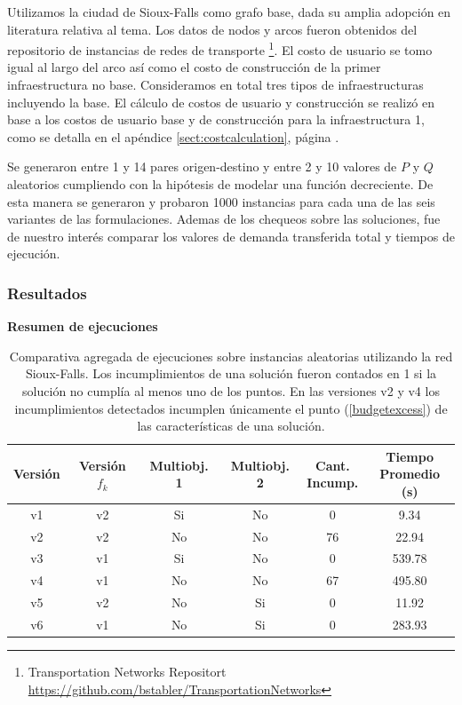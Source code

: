 \documentclass{article}
\begin{document}
  Utilizamos la ciudad de Sioux-Falls como grafo base, dada su amplia adopción en literatura relativa al tema. Los datos de nodos y arcos fueron obtenidos del repositorio de instancias de redes de transporte \footnote{Transportation Networks Repositort \url{https://github.com/bstabler/TransportationNetworks}}. El costo de usuario se tomo igual al largo del arco así como el costo de construcción de la primer infraestructura no base. Consideramos en total tres tipos de infraestructuras incluyendo la base. El cálculo de costos de usuario y construcción se realizó en base a los costos de usuario base y de construcción para la infraestructura 1, como se detalla en el apéndice \ref{sect:costcalculation}, página \pageref{sect:costcalculation}.

  Se generaron entre 1 y 14 pares origen-destino y entre 2 y 10 valores de $P$ y $Q$ aleatorios cumpliendo con la hipótesis de modelar una función decreciente.
  De esta manera se generaron y probaron 1000 instancias para cada una de las seis variantes de las formulaciones. Ademas de los chequeos sobre las soluciones, fue de nuestro interés comparar los valores de demanda transferida total y tiempos de ejecución.

  \FloatBarrier
  \subsubsection{Resultados}

  \begin{table}[h!]
    \centering
    \caption*{{\bf Resumen de ejecuciones}}
    \begin{tabular}{cccccc}
      \toprule
      Versión & Versión $f_k$ & Multiobj. 1 & Multiobj. 2 & \shortstack{Cant. \\ Incump.} & \shortstack{Tiempo \\ Promedio (s)} \\
      \midrule
      v1 & v2 & Si & No & 0   & 9.34    \\
      v2 & v2 & No & No & 76  & 22.94   \\
      v3 & v1 & Si & No & 0   & 539.78  \\
      v4 & v1 & No & No & 67  & 495.80  \\
      v5 & v2 & No & Si & 0   & 11.92   \\
      v6 & v1 & No & Si & 0   & 283.93  \\
      \bottomrule
    \end{tabular}
    \caption{Comparativa agregada de ejecuciones sobre instancias aleatorias utilizando la red Sioux-Falls. Los incumplimientos de una solución fueron contados en 1 si la solución no cumplía al menos uno de los puntos. En las versiones v2 y v4 los incumplimientos detectados incumplen únicamente el punto (\ref{budgetexcess}) de las características de una solución.}\label{table:resumenejecuciones}
  \end{table}
\end{document}
